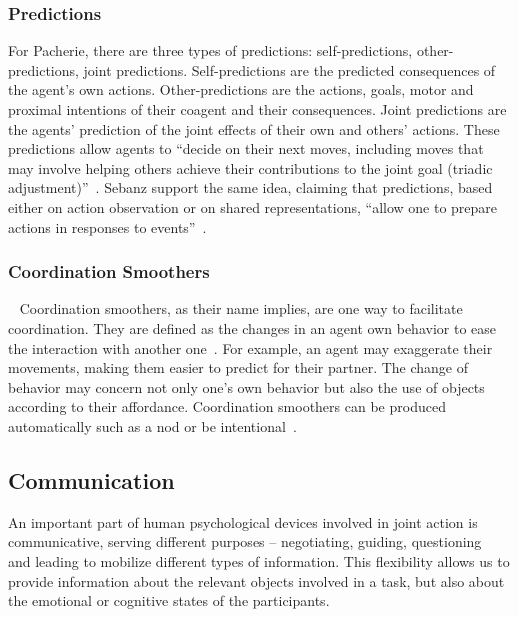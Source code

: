 \documentclass[a4paper,11pt,twoside]{StyleThese}
\begin{document}
\subsubsection{Predictions}\label{chap1:subsubsec:pred}
For Pacherie, there are three types of predictions: self-predictions, other-predictions, joint predictions. Self-predictions are the predicted consequences of the agent's own actions. Other-predictions are the actions, goals, motor and proximal intentions of their coagent and their consequences. Joint predictions are the agents' prediction of the joint effects of their own and others' actions. These predictions allow agents to ``decide on their next moves, including moves that may involve helping others achieve their contributions to the joint goal (triadic adjustment)''~\cite[pp.~354-355]{pacherie_2012_agency}. Sebanz \etal{} support the same idea, claiming that predictions, based either on action observation or on shared representations, ``allow one to prepare actions in responses to events''~\cite[p.~73]{sebanz_2006_joint}.

\subsubsection{Coordination Smoothers}~\label{chap1:subsubsec:coord_smooth}
Coordination smoothers, as their name implies, are one way to facilitate coordination. They are defined as the changes in an agent own behavior to ease the interaction with another one~\cite{vesper_2010_minimal}. For example, an agent may exaggerate their movements, making them easier to predict for their partner. The change of behavior may concern not only one's own behavior but also the use of objects according to their affordance. Coordination smoothers can be produced automatically such as a nod or be intentional~\cite{michael_2015_commitments}.


\subsection{Communication}\label{chap1:subsec:comm}
An important part of human psychological devices involved in joint action is communicative, serving different purposes – \eg negotiating, guiding, questioning~\cite{austin_1962_how, clark_1992_arenas, sperber_1995_relevance} and leading to mobilize different types of information. This flexibility allows us to provide information about the relevant objects involved in a task, but also about the emotional or cognitive states of the participants. 
\end{document}

